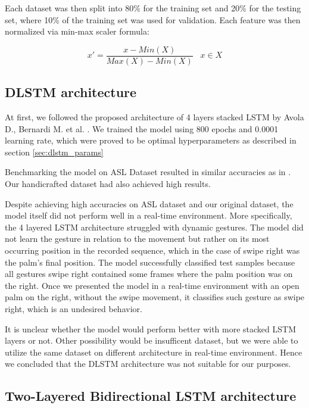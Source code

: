 Each dataset was then split into 80\% for the training set and 20\% for the testing set, where 10\% of the training set was used for validation. Each feature was then normalized via min-max scaler formula:

\begin{equation}
    { x' = \frac{x - Min(X)}{Max(X)-Min(X)}\;\;\; x \in X}
\end{equation}

\subsection{DLSTM architecture}

At first, we followed the proposed architecture of 4 layers stacked LSTM by Avola D., Bernardi M. et al. \cite{avola}. We trained the model using 800 epochs and 0.0001 learning rate, which were proved to be optimal hyperparameters as described in section \ref{sec:dlstm_params}

Benchmarking the model on ASL Dataset resulted in similar accuracies as in \cite{avola}. Our handicrafted dataset had also achieved high results.

Despite achieving high accuracies on ASL dataset and our original dataset, the model itself did not perform well in a real-time environment. More specifically, the 4 layered LSTM architecture struggled with dynamic gestures. The model did not learn the gesture in relation to the movement but rather on its most occurring position in the recorded sequence, which in the case of swipe right was the palm's final position. The model successfully classified test samples because all gestures swipe right contained some frames where the palm position was on the right. Once we presented the model in a real-time environment with an open palm on the right, without the swipe movement, it classifies such gesture as swipe right, which is an undesired behavior. 

It is unclear whether the model would perform better with more stacked LSTM layers or not. Other possibility would be insufficent dataset, but we were able to utilize the same dataset on different architecture in real-time environment. Hence we concluded that the DLSTM architecture was not suitable for our purposes.

\subsection{Two-Layered Bidirectional LSTM architecture}


